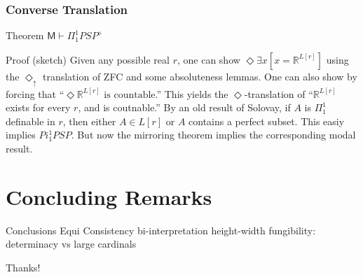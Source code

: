 \documentclass{beamer}
\begin{document}
\begin{frame}
    \frametitle{Converse Translation}
\begin{block}{Theorem}
$\mathsf{M} \vdash \Pi_1^1 PSP^\diamond$
\end{block}
\begin{block}{Proof (sketch)}
     Given any possible real $r$, one can show $\Diamond \exists x[ x = \mathbb{R}^{L[r]}]$
    using the $\Diamond_\uparrow$ translation of ZFC and some absoluteness lemmas. 
     One can also show by forcing that ``$\Diamond \mathbb{R}^{L[r]} \text{ is countable}$.''
     This yields the $\Diamond$-translation of ``$\mathbb{R}^{L[r]}$ exists for every $r$, and is coutnable.''
     By an old result of Solovay, if $A$ is $\Pi^1_1$ definable in $r$, then 
    either $A \in L[r]$ or $A$ contains a perfect subset. This easiy implies $Pi_1^1 PSP$.
     But now the mirroring theorem implies the corresponding modal result.
    
\end{block}
\end{frame}
\section{Concluding Remarks}
\begin{frame}{Conclusions}
    Equi Consistency
    bi-interpretation
    height-width fungibility: determinacy vs large cardinals
\end{frame}

\begin{frame}
\Huge{\centerline{Thanks!}}
\end{frame}
\end{document}
